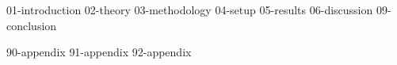 \documentclass[a4paper,oneside,10pt,ngerman,english]{scrbook}
\begin{document}

\mainmatter


{01-introduction}
{02-theory}
{03-methodology}
{04-setup}
{05-results}
{06-discussion}
{09-conclusion}


\cleardoubleoddpage
\printbibliography

\appendix


{90-appendix}
{91-appendix}
{92-appendix}


\listoftables

\listoffigures




\cleardoubleoddpage
\end{document}
